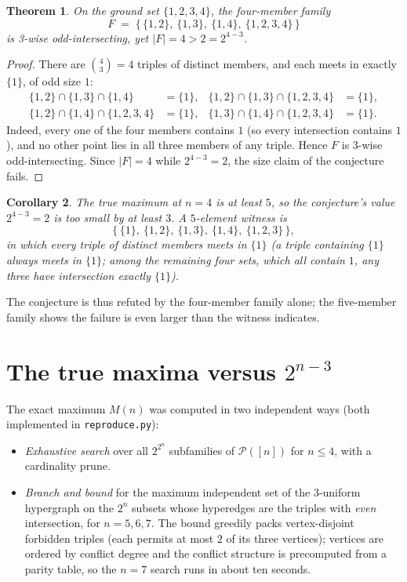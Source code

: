 \documentclass[11pt]{article}
\newtheorem{theorem}{Theorem}
\newtheorem{corollary}[theorem]{Corollary}
\theoremstyle{definition}
\theoremstyle{remark}
\newcommand{\Pn}{\mathcal{P}}
\begin{document}
\begin{theorem}\label{thm:witness}
On the ground set $\{1,2,3,4\}$, the four-member family
\[
F \;=\; \bigl\{\, \{1,2\},\ \{1,3\},\ \{1,4\},\ \{1,2,3,4\}\,\bigr\}
\]
is 3-wise odd-intersecting, yet $|F| = 4 > 2 = 2^{4-3}$.
\end{theorem}

\begin{proof}
There are $\binom{4}{3} = 4$ triples of distinct members, and each meets in
exactly $\{1\}$, of odd size $1$:
\[
\begin{array}{llll}
\{1,2\}\cap\{1,3\}\cap\{1,4\} &= \{1\}, & \{1,2\}\cap\{1,3\}\cap\{1,2,3,4\} &= \{1\},\\[2pt]
\{1,2\}\cap\{1,4\}\cap\{1,2,3,4\} &= \{1\}, & \{1,3\}\cap\{1,4\}\cap\{1,2,3,4\} &= \{1\}.
\end{array}
\]
Indeed, every one of the four members contains $1$ (so every intersection
contains $1$), and no other point lies in all three members of any triple. Hence
$F$ is 3-wise odd-intersecting. Since $|F| = 4$ while $2^{4-3} = 2$, the size
claim of the conjecture fails.
\end{proof}

\begin{corollary}
The true maximum at $n = 4$ is at least $5$, so the conjecture's value
$2^{4-3} = 2$ is too small by at least $3$. A $5$-element witness is
\[
\bigl\{\, \{1\},\ \{1,2\},\ \{1,3\},\ \{1,4\},\ \{1,2,3\}\,\bigr\},
\]
in which every triple of distinct members meets in $\{1\}$ (a triple containing
$\{1\}$ always meets in $\{1\}$; among the remaining four sets, which all
contain $1$, any three have intersection exactly $\{1\}$).
\end{corollary}

The conjecture is thus refuted by the four-member family alone; the five-member
family shows the failure is even larger than the witness indicates.

\section{The true maxima versus $2^{n-3}$}

The exact maximum $M(n)$ was computed in two independent ways (both implemented
in \texttt{reproduce.py}):

\begin{itemize}
\item \emph{Exhaustive search} over all $2^{2^n}$ subfamilies of $\Pn([n])$ for
$n \le 4$, with a cardinality prune.
\item \emph{Branch and bound} for the maximum independent set of the $3$-uniform
hypergraph on the $2^n$ subsets whose hyperedges are the triples with
\emph{even} intersection, for $n = 5, 6, 7$. The bound greedily packs
vertex-disjoint forbidden triples (each permits at most $2$ of its three
vertices); vertices are ordered by conflict degree and the conflict structure is
precomputed from a parity table, so the $n = 7$ search runs in about ten seconds.
\end{itemize}
\end{document}
